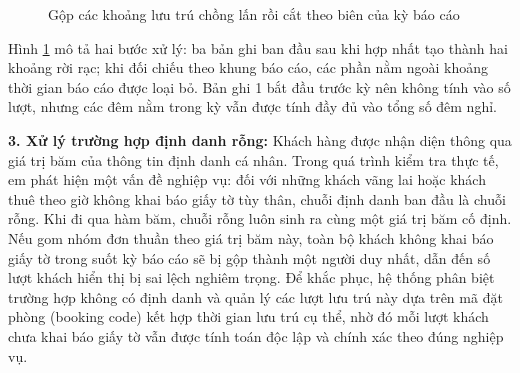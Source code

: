 \begin{figure}[htbp]
\centering
{}
\caption{Gộp các khoảng lưu trú chồng lấn rồi cắt theo biên của kỳ báo cáo}
\label{hinh:gopkhoang}
\end{figure}

\indent Hình \ref{hinh:gopkhoang} mô tả hai bước xử lý: ba bản ghi ban đầu sau khi hợp nhất tạo thành hai khoảng rời rạc; khi đối chiếu theo khung báo cáo, các phần nằm ngoài khoảng thời gian báo cáo được loại bỏ. Bản ghi 1 bắt đầu trước kỳ nên không tính vào số lượt, nhưng các đêm nằm trong kỳ vẫn được tính đầy đủ vào tổng số đêm nghỉ.

\textbf{3. Xử lý trường hợp định danh rỗng:} Khách hàng được nhận diện thông qua giá trị băm của thông tin định danh cá nhân. Trong quá trình kiểm tra thực tế, em phát hiện một vấn đề nghiệp vụ: đối với những khách vãng lai hoặc khách thuê theo giờ không khai báo giấy tờ tùy thân, chuỗi định danh ban đầu là chuỗi rỗng. Khi đi qua hàm băm, chuỗi rỗng luôn sinh ra cùng một giá trị băm cố định. Nếu gom nhóm đơn thuần theo giá trị băm này, toàn bộ khách không khai báo giấy tờ trong suốt kỳ báo cáo sẽ bị gộp thành một người duy nhất, dẫn đến số lượt khách hiển thị bị sai lệch nghiêm trọng. Để khắc phục, hệ thống phân biệt trường hợp không có định danh và quản lý các lượt lưu trú này dựa trên mã đặt phòng (booking code) kết hợp thời gian lưu trú cụ thể, nhờ đó mỗi lượt khách chưa khai báo giấy tờ vẫn được tính toán độc lập và chính xác theo đúng nghiệp vụ.

